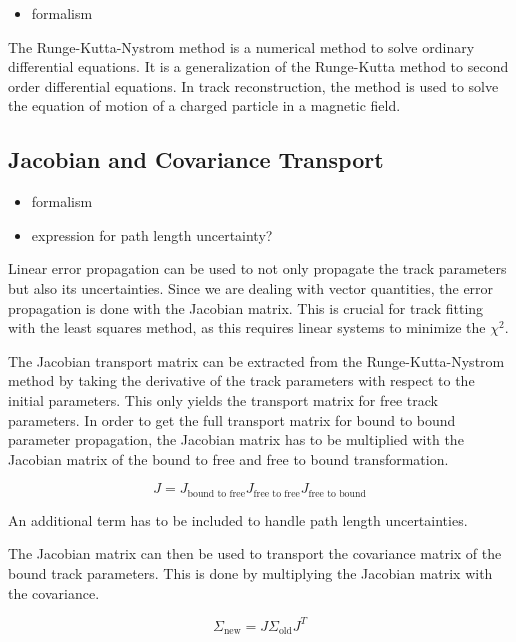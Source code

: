 \begin{itemize}
    \color{red}
    \item formalism
\end{itemize}

The Runge-Kutta-Nystrom method is a numerical method to solve ordinary differential equations. It is a generalization of the Runge-Kutta method to second order differential equations. In track reconstruction, the method is used to solve the equation of motion of a charged particle in a magnetic field.

\subsection{Jacobian and Covariance Transport}

\begin{itemize}
    \color{red}
    \item formalism
    \item expression for path length uncertainty?
\end{itemize}

Linear error propagation can be used to not only propagate the track parameters but also its uncertainties. Since we are dealing with vector quantities, the error propagation is done with the Jacobian matrix. This is crucial for track fitting with the least squares method, as this requires linear systems to minimize the $\chi^2$.

The Jacobian transport matrix can be extracted from the Runge-Kutta-Nystrom method by taking the derivative of the track parameters with respect to the initial parameters. This only yields the transport matrix for free track parameters. In order to get the full transport matrix for bound to bound parameter propagation, the Jacobian matrix has to be multiplied with the Jacobian matrix of the bound to free and free to bound transformation.

\begin{equation}
    J = J_{\text{bound to free}} J_{\text{free to free}} J_{\text{free to bound}}
\end{equation}

An additional term has to be included to handle path length uncertainties.

The Jacobian matrix can then be used to transport the covariance matrix of the bound track parameters. This is done by multiplying the Jacobian matrix with the covariance.

\begin{equation}
    \Sigma_{\text{new}} = J \Sigma_{\text{old}} J^T
\end{equation}

